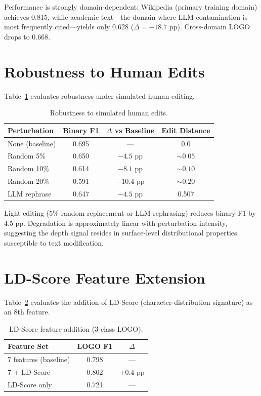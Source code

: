 \documentclass[11pt,a4paper]{article}
\begin{document}
Performance is strongly domain-dependent: Wikipedia (primary training domain) achieves 0.815, while academic text---the domain where LLM contamination is most frequently cited---yields only 0.628 ($\Delta = -18.7$ pp). Cross-domain LOGO drops to 0.668.

\section{Robustness to Human Edits}
\label{app:edits}

Table~\ref{tab:edits} evaluates robustness under simulated human editing.

\begin{table}[h]
\centering
\small
\caption{Robustness to simulated human edits.}
\label{tab:edits}
\begin{tabular}{lccc}
\toprule
Perturbation & Binary F1 & $\Delta$ vs Baseline & Edit Distance \\
\midrule
None (baseline) & 0.695 & --- & 0.0 \\
Random 5\% & 0.650 & $-4.5$ pp & ${\sim}0.05$ \\
Random 10\% & 0.614 & $-8.1$ pp & ${\sim}0.10$ \\
Random 20\% & 0.591 & $-10.4$ pp & ${\sim}0.20$ \\
LLM rephrase & 0.647 & $-4.5$ pp & 0.507 \\
\bottomrule
\end{tabular}
\end{table}

Light editing (5\% random replacement or LLM rephrasing) reduces binary F1 by 4.5 pp. Degradation is approximately linear with perturbation intensity, suggesting the depth signal resides in surface-level distributional properties susceptible to text modification.

\section{LD-Score Feature Extension}
\label{app:ld}

Table~\ref{tab:ld} evaluates the addition of LD-Score (character-distribution signature) as an 8th feature.

\begin{table}[h]
\centering
\small
\caption{LD-Score feature addition (3-class LOGO).}
\label{tab:ld}
\begin{tabular}{lcc}
\toprule
Feature Set & LOGO F1 & $\Delta$ \\
\midrule
7 features (baseline) & 0.798 & --- \\
7 + LD-Score & 0.802 & $+0.4$ pp \\
LD-Score only & 0.721 & --- \\
\bottomrule
\end{tabular}
\end{table}
\end{document}
